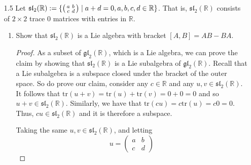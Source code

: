 \documentclass[12pt]{article}
\theoremstyle{definition}
\newenvironment{solution}
{\renewcommand\qedsymbol{$\blacksquare$}\begin{proof}[Solution]}
{\end{proof}}
\newenvironment{psmall}{\left(\begin{smallmatrix}}{\end{smallmatrix}\right)}
\newcommand{\R}{\mathbb{R}}
\begin{document}
\begin{enumerate}
\begin{solution}
\begin{equation*}
                \end{equation*}
                the last system yields $b=-1$ and $d=1$. Hence
                \begin{equation*}
                    A=\begin{pmatrix}2 & -1\\
                    1 & 1\end{pmatrix}.
                \end{equation*}
            \end{solution}
        \item[1.5] Let
            $\mathfrak{sl}_2(\R):=\{\begin{psmall}a&b\\c&d\end{psmall}\mid
            a+d=0, a, b, c, d\in\R\}$. That is, $\mathfrak{sl}_2(\R)$ consists
            of $2\times 2$ trace 0 matrices with entries in $\R$.
            \begin{enumerate}[label=(\alph*)]
                \item Show that $\mathfrak{sl}_2(\R)$ is a Lie algebra with
                    bracket $[A, B]=AB-BA$.
                    \begin{proof}
                        As a subset of $\mathfrak{gl}_{2}(\R)$, which
                        is a Lie algebra, we can prove the claim by
                        showing that $\mathfrak{sl}_{2}(\mathbb{R})$
                        is a Lie subalgebra of $\mathfrak{gl}_{2}(\R)$.
                        Recall that a Lie subalgebra is a subspace
                        closed under the bracket of the outer space. So
                        do prove our claim,
                        consider any $c\in\mathbb{R}$ and any $u,
                        v\in\mathfrak{sl}_{2}(\mathbb{R})$. It follows that
                        $\text{tr}(u+v)=\text{tr}(u)+\text{tr}(v)=0+0=0$
                        and so $u+v\in\mathfrak{sl}_{2}(\mathbb{R})$.
                        Similarly, we have that
                        $\text{tr}(cu)=c\text{tr}(u)=c0=0$. Thus,
                        $cu\in\mathfrak{sl}_{2}(\mathbb{R})$ and it is
                        therefore a subspace.\par\hspace{4mm} Taking
                        the same $u,
                        v\in\mathfrak{sl}_{2}(\mathbb{R})$, and letting 
                        \begin{equation*}
                            u=\begin{pmatrix} a&b\\c&d

\end{pmatrix}
\end{equation*}
\end{proof}
\end{enumerate}
\end{enumerate}
\end{document}
